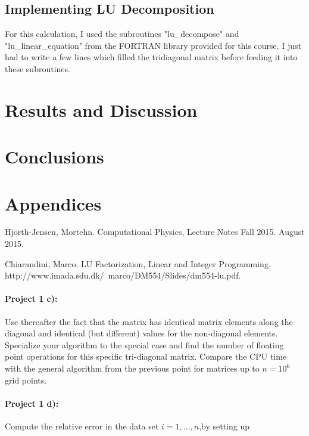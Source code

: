\documentclass[%
oneside,                 %
final,                   %
10pt]{article}
\begin{document}
\subsection{Implementing LU Decomposition}

For this calculation, I used the subroutines "lu_decompose" and "lu_linear_equation" from the FORTRAN library provided for this course.  I just had to write a few lines which filled the tridiagonal matrix before feeding it into these subroutines.

\section{Results and Discussion}

\section{Conclusions}

\section{Appendices}

\begin{thebibliography}{9}

Hjorth-Jensen, Mortehn. 
Computational Physics, Lecture Notes Fall 2015. 
August 2015.

Chiarandini, Marco. 
LU Factorization, Linear and Integer Programming. 
http://www.imada.sdu.dk/~marco/DM554/Slides/dm554-lu.pdf.

\end{thebibliography}

\paragraph{Project 1 c):}
Use thereafter the fact that the matrix has identical matrix elements along the diagonal and identical (but different) values for the non-diagonal elements. Specialize your algorithm to the special case and find the number of floating point operations
for this specific tri-diagonal matrix. Compare the CPU time with the general algorithm from the previous point for matrices up to  $n=10^6$ grid points. 

\paragraph{Project 1 d):}
Compute the relative error  in the data set $i=1,\dots, n$,by setting up
\end{document}
